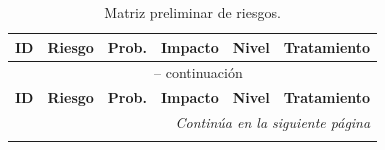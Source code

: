\begin{longtable}{@{}c p{4.5cm} ccc p{5.5cm}@{}}
\caption{Matriz preliminar de riesgos.}
\label{tab:matriz_riesgos} \\
\toprule
\textbf{ID} & \textbf{Riesgo} & \textbf{Prob.} & \textbf{Impacto} & \textbf{Nivel} & \textbf{Tratamiento} \\
\midrule
\endfirsthead

\multicolumn{6}{c}{\tablename\ \thetable{} -- continuación} \\
\toprule
\textbf{ID} & \textbf{Riesgo} & \textbf{Prob.} & \textbf{Impacto} & \textbf{Nivel} & \textbf{Tratamiento} \\
\midrule
\endhead

\midrule
\multicolumn{6}{r}{\textit{Continúa en la siguiente página}} \\
\endfoot

\bottomrule
\endlastfoot


\end{longtable}
